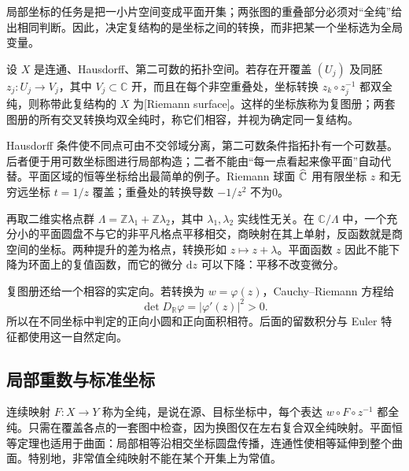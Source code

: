 局部坐标的任务是把一小片空间变成平面开集；两张图的重叠部分必须对“全纯”给出相同判断。因此，决定复结构的是坐标之间的转换，而非把某一个坐标选为全局变量。

\begin{definition}[Riemann 曲面]\label{b3:def:A-riemann-surface}
设 \(X\) 是连通、Hausdorff、第二可数的拓扑空间。若存在开覆盖 \((U_j)\) 及同胚 \(z_j:U_j\rightarrow V_j\)，其中 \(V_j\subset\mathbb C\) 开，而且在每个非空重叠处，坐标转换 \(z_k\circ z_j^{-1}\) 都双全纯，则称带此复结构的 \(X\) 为[Riemann surface]。这样的坐标族称为复图册；两套图册的所有交叉转换均双全纯时，称它们相容，并视为确定同一复结构。
\end{definition}

Hausdorff 条件使不同点可由不交邻域分离，第二可数条件指拓扑有一个可数基。后者便于用可数坐标图进行局部构造；二者不能由“每一点看起来像平面”自动代替。平面区域的恒等坐标给出最简单的例子。Riemann 球面 \(\widehat{\mathbb C\kern0pt}\) 用有限坐标 \(z\) 和无穷远坐标 \(t=1/z\) 覆盖；重叠处的转换导数 \(-1/z^2\) 不为0。

\ProseParagraphBreak
再取二维实格点群 \(\Lambda=\mathbb Z\lambda_1+\mathbb Z\lambda_2\)，其中 \(\lambda_1,\lambda_2\) 实线性无关。在 \(\mathbb C/\Lambda\) 中，一个充分小的平面圆盘不与它的非平凡格点平移相交，商映射在其上单射，反函数就是商空间的坐标。两种提升的差为格点，转换形如 \(z\mapsto z+\lambda\)。平面函数 \(z\) 因此不能下降为环面上的复值函数，而它的微分 \(\mathrm{d}z\) 可以下降：平移不改变微分。

\ProseParagraphBreak
复图册还给一个相容的实定向。若转换为 \(w=\varphi(z)\)，Cauchy--Riemann 方程给
\[
 \det D_{\mathbb R}\varphi=|\varphi'(z)|^2>0.
\]
所以在不同坐标中判定的正向小圆和正向面积相符。后面的留数积分与 Euler 特征都使用这一自然定向。

\subsection{局部重数与标准坐标}
\label{b3:subsec:A0102}

连续映射 \(F:X\rightarrow Y\) 称为全纯，是说在源、目标坐标中，每个表达 \(w\circ F\circ z^{-1}\) 都全纯。只需在覆盖各点的一套图中检查，因为换图仅在左右复合双全纯映射。平面恒等定理也适用于曲面：局部相等沿相交坐标圆盘传播，连通性使相等延伸到整个曲面。特别地，非常值全纯映射不能在某个开集上为常值。

